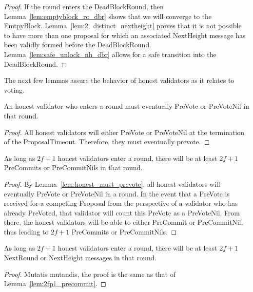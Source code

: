\begin{proof}
If the round enters the DeadBlockRound, then Lemma~\ref{lem:emptyblock_rc_dbr}
shows that we will converge to the EmtpyBlock.
Lemma~\ref{lem:2_distinct_nextheight}
proves that it is not possible to have more than one proposal for which
an associated NextHeight message has been validly formed before the
DeadBlockRound.
Lemma~\ref{lem:safe_unlock_nh_dbr}
allows for a safe transition into the DeadBlockRound.
\end{proof}

The next few lemmas assure the behavior of honest validators as it relates to
voting.

\begin{lem}
\label{lem:honest_must_prevote}
An honest validator who enters a round must eventually PreVote or PreVoteNil in
that round.
\end{lem}

\begin{proof}
All honest validators will either PreVote or PreVoteNil at the termination of
the ProposalTimeout.
Therefore, they must eventually prevote.
\end{proof}

\begin{lem}
\label{lem:2fp1_precommit}
As long as $2f+1$ honest validators enter a round, there will be at least
$2f+1$ PreCommits or PreCommitNils in that round.
\end{lem}

\begin{proof}
By Lemma~\ref{lem:honest_must_prevote},
all honest validators will eventually PreVote or PreVoteNil in a round.
In the event that a PreVote is received for a competing Proposal from the
perspective of a validator who has already PreVoted, that validator will count
this PreVote as a PreVoteNil.
From there, the honest validators will be able to either PreCommit or
PreCommitNil, thus leading to $2f+1$ PreCommits or PreCommitNils.
\end{proof}

\begin{lem}
\label{lem:2fp1_nextround}
As long as $2f+1$ honest validators enter a round, there will be at least
$2f+1$ NextRound or NextHeight messages in that round.
\end{lem}

\begin{proof}
Mutatis mutandis, the proof is the same as that of
Lemma~\ref{lem:2fp1_precommit}.
\end{proof}

